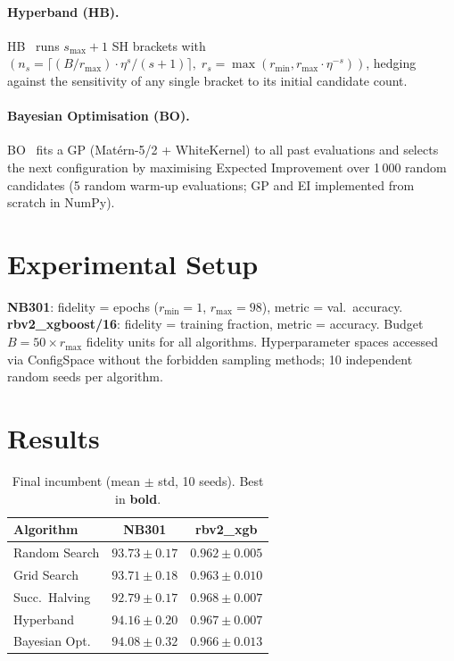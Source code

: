 \documentclass{AIM_report}
\begin{document}
\paragraph{Hyperband (HB).}
HB~\cite{li2018hyperband} runs $s_{\max}{+}1$ SH brackets with
$(n_s{=}\lceil(B/r_{\max})\cdot\eta^s/(s{+}1)\rceil,\;
r_s{=}\max(r_{\min}, r_{\max}{\cdot}\eta^{-s}))$,
hedging against the sensitivity of any single bracket to its initial
candidate count.

\paragraph{Bayesian Optimisation (BO).}
BO~\cite{snoek2012practical} fits a GP (Mat\'{e}rn-5/2 + WhiteKernel)
to all past evaluations and selects the next configuration by maximising
Expected Improvement over 1\,000 random candidates (5 random warm-up
evaluations; GP and EI implemented from scratch in NumPy).

\section{Experimental Setup}

\textbf{NB301}: fidelity = epochs ($r_{\min}{=}1$, $r_{\max}{=}98$),
metric = val.\ accuracy.
\textbf{rbv2\_xgboost/16}: fidelity = training fraction, metric = accuracy.
Budget $B{=}50{\times}r_{\max}$ fidelity units for all algorithms.
Hyperparameter spaces accessed via ConfigSpace without the forbidden
sampling methods; 10 independent random seeds per algorithm.

\section{Results}

\begin{table}[h]
  \centering
  \renewcommand{\tabcolsep}{4pt}
  \renewcommand{\arraystretch}{1.05}
  \caption{Final incumbent (mean $\pm$ std, 10 seeds). Best in \textbf{bold}.}
  \label{tab:results}
  \small
  \begin{tabular}{lcc}
    \toprule
    \textbf{Algorithm} & \textbf{NB301} & \textbf{rbv2\_xgb} \\
    \midrule
    Random Search    & $93.73 \pm 0.17$ & $0.962 \pm 0.005$ \\
    Grid Search      & $93.71 \pm 0.18$ & $0.963 \pm 0.010$ \\
    Succ.\ Halving   & $92.79 \pm 0.17$ & $\mathbf{0.968 \pm 0.007}$ \\
    Hyperband        & $\mathbf{94.16 \pm 0.20}$ & $0.967 \pm 0.007$ \\
    Bayesian Opt.    & $94.08 \pm 0.32$ & $0.966 \pm 0.013$ \\
    \bottomrule
  \end{tabular}
\end{table}
\end{document}
